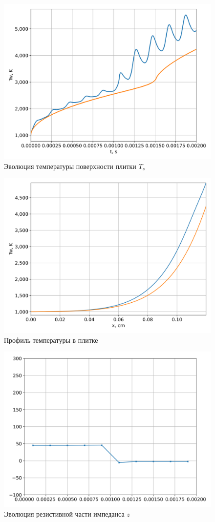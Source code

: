 \begin{figure}[H]
	\centering
	\includegraphics[width=0.7\linewidth]{material/omega10amp1.0/temperature_plot.png}
    \caption[]{Эволюция температуры поверхности плитки $T_s$}
    \label{pic::heatcond::omega10amp1.0::temperature_plot}
\end{figure}

\begin{figure}[H]
	\centering
	\includegraphics[width=0.7\linewidth]{material/omega10amp1.0/temperature_distribution_plot.png}
    \caption[]{Профиль температуры в плитке}
    \label{pic::heatcond::omega10amp1.0::temperature_distribution_plot}
\end{figure}
\begin{figure}[H]
	\centering
	\includegraphics[width=0.7\linewidth]{material/z_plot.png}
    \caption[]{Эволюция резистивной части импеданса $z$ }
    \label{pic::heatcond::omega10amp1.0::z_plot}
\end{figure}
